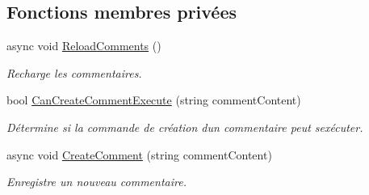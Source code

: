 \subsection*{Fonctions membres privées}
\begin{DoxyCompactItemize}
\item 
async void \hyperlink{class_boxes_1_1_view_models_1_1_post_view_model_a3ceff0a86b3a432381812b4c7d9ea47b}{Reload\+Comments} ()
\begin{DoxyCompactList}\small\item\em Recharge les commentaires. \end{DoxyCompactList}\item 
bool \hyperlink{class_boxes_1_1_view_models_1_1_post_view_model_adeb6ebc237236f8b369a9b6d3f759597}{Can\+Create\+Comment\+Execute} (string comment\+Content)
\begin{DoxyCompactList}\small\item\em Détermine si la commande de création d\textquotesingle{}un commentaire peut s\textquotesingle{}exécuter. \end{DoxyCompactList}\item 
async void \hyperlink{class_boxes_1_1_view_models_1_1_post_view_model_ad25bcaaa06f623070320755a2d28404c}{Create\+Comment} (string comment\+Content)
\begin{DoxyCompactList}\small\item\em Enregistre un nouveau commentaire. \end{DoxyCompactList}\end{DoxyCompactItemize}

